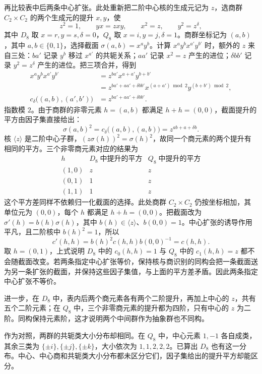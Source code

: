 \ProseParagraphBreak
再比较表中后两条中心扩张。此处重新把二阶中心核的生成元记为 \(z\)，选商群 \(C_2\times C_2\) 的两个生成元的提升 \(x,y\)，使
\[
	z^2=1,\qquad yx=zxy,\qquad x^2=z,\qquad y^2=z^\delta,
\]
其中 \(D_8\) 取 \(x=r,y=s,\delta=0\)，\(Q_8\) 取 \(x=i,y=j,\delta=1\)。商群坐标记为 \((a,b)\)，其中 \(a,b\in\{0,1\}\)，选择截面 \(\sigma(a,b)=x^ay^b\)。计算 \(x^ay^bx^{a'}y^{b'}\) 时，额外的 \(z\) 来自三处：\(ba'\) 记录 \(y^b\) 移过 \(x^{a'}\) 的共轭关系；\(aa'\) 记录 \(x^2=z\) 产生的进位；\(\delta bb'\) 记录 \(y^2=z^\delta\) 产生的进位。把三项合并，得到
\[
	\begin{aligned}
		x^ay^b x^{a'}y^{b'} &=z^{ba'}x^{a+a'}y^{b+b'}\\
		&=z^{ba'+aa'+\delta bb'} x^{(a+a')\bmod 2}y^{(b+b')\bmod 2},\\
		c_\delta\bigl((a,b),(a',b')\bigr) &=z^{ba'+aa'+\delta bb'}.
	\end{aligned}
\]
指数模 \(2\)。由于商群的非零元素 \(h=(a,b)\) 都满足 \(h+h=(0,0)\)，截面提升的平方由因子集直接给出：
\[
	\sigma(a,b)^2=c_\delta\bigl((a,b),(a,b)\bigr) =z^{ab+a+\delta b}.
\]
核 \(\langle z\rangle\) 是二阶中心子群，\((z\sigma(h))^2=\sigma(h)^2\)，故同一个商元素的两个提升有相同的平方。三个非零商元素对应的结果为
\[
	\begin{array}{c|cc}
		h & D_8\;\text{中提升的平方} & Q_8\;\text{中提升的平方}\\
		\hline
		(1,0) & z & z\\
		(0,1) & 1 & z\\
		(1,1) & 1 & z
	\end{array}
\]
这个平方差同样不依赖归一化截面的选择。此处商群 \(C_2\times C_2\) 仍按坐标相加，其单位元为 \((0,0)\)，每个 \(h\) 都满足 \(h+h=(0,0)\)。把截面改为 \(\sigma'(h)=b(h)\sigma(h)\)，其中 \(b(h)\in\langle z\rangle\)、\(b(0,0)=1\)。中心扩张的诱导作用平凡，且二阶核中 \(b(h)^2=1\)，所以
\[
	c'(h,h)=b(h)^2c(h,h)b(0,0)^{-1}=c(h,h).
\]
取 \(h=(0,1)\)，上式说明 \(D_8\) 中的 \(c_0(h,h)=1\) 与 \(Q_8\) 中的 \(c_1(h,h)=z\) 都不会随截面改变。若两条指定中心扩张等价，保持核与商识别的同构会把一条截面送为另一条扩张的截面，并保持这些因子集值，与上面的平方差矛盾。因此两条指定中心扩张不等价。

\ProseParagraphBreak
进一步，在 \(D_8\) 中，表内后两个商元素各有两个二阶提升，再加上中心的 \(z\)，共有五个二阶元素；在 \(Q_8\) 中，三个非零商元素的提升都为四阶，只有中心的 \(z\) 为二阶。同构保持元素阶，这才说明两个中间群作为抽象群也不同构。

\ProseParagraphBreak
作为对照，两群的共轭类大小分布却相同。在 \(Q_8\) 中，中心元素 \(1,-1\) 各自成类，其余三类为 \(\{\pm i\},\{\pm j\},\{\pm k\}\)，大小依次为 \(1,1,2,2,2\)。已算出 \(D_8\) 也有这一分布。中心、中心商和共轭类大小分布都未区分它们，因子集给出的提升平方却能区分。

